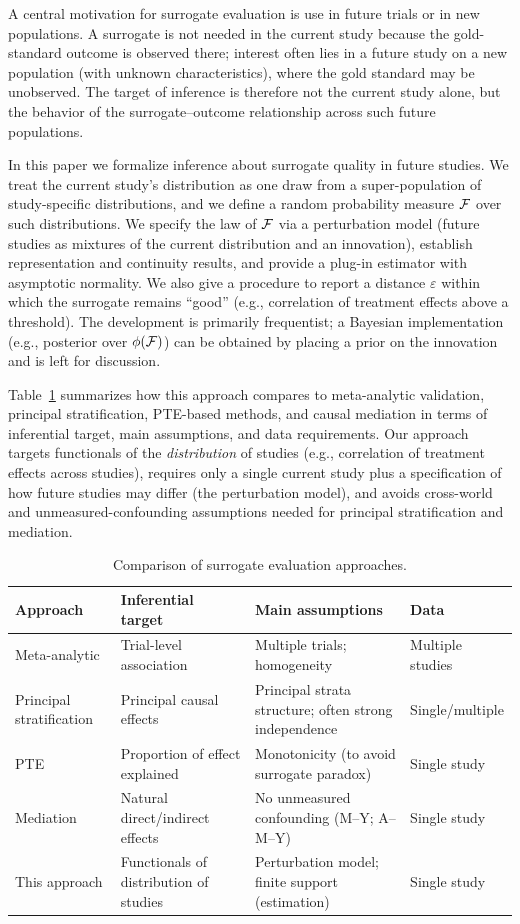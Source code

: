 \documentclass{article}
\begin{document}
A central motivation for surrogate evaluation is use in future trials or in new populations. A surrogate is not needed in the current study because the gold-standard outcome is observed there; interest often lies in a future study on a new population (with unknown characteristics), where the gold standard may be unobserved. The target of inference is therefore not the current study alone, but the behavior of the surrogate--outcome relationship across such future populations.

In this paper we formalize inference about surrogate quality in future studies. We treat the current study's distribution as one draw from a super-population of study-specific distributions, and we define a random probability measure $\mathcal{F}$ over such distributions. We specify the law of $\mathcal{F}$ via a perturbation model (future studies as mixtures of the current distribution and an innovation), establish representation and continuity results, and provide a plug-in estimator with asymptotic normality. We also give a procedure to report a distance $\varepsilon$ within which the surrogate remains ``good'' (e.g., correlation of treatment effects above a threshold). The development is primarily frequentist; a Bayesian implementation (e.g., posterior over $\phi(\mathcal{F})$) can be obtained by placing a prior on the innovation and is left for discussion.

Table~\ref{tab:comparison} summarizes how this approach compares to meta-analytic validation, principal stratification, PTE-based methods, and causal mediation in terms of inferential target, main assumptions, and data requirements. Our approach targets functionals of the \emph{distribution} of studies (e.g., correlation of treatment effects across studies), requires only a single current study plus a specification of how future studies may differ (the perturbation model), and avoids cross-world and unmeasured-confounding assumptions needed for principal stratification and mediation.

\begin{table}[htbp]
\centering
\caption{Comparison of surrogate evaluation approaches.}
\label{tab:comparison}
\begin{tabular}{llll}
\toprule
Approach & Inferential target & Main assumptions & Data \\
\midrule
Meta-analytic \cite{buyse2000validation} & Trial-level association & Multiple trials; homogeneity & Multiple studies \\
Principal stratification \cite{frangakis2002principal} & Principal causal effects & Principal strata structure; often strong independence & Single/multiple \\
PTE \cite{chen2003pte} & Proportion of effect explained & Monotonicity (to avoid surrogate paradox) & Single study \\
Mediation \cite{vanderweele2015mediation} & Natural direct/indirect effects & No unmeasured confounding (M--Y; A--M--Y) & Single study \\
This approach & Functionals of distribution of studies & Perturbation model; finite support (estimation) & Single study \\
\bottomrule
\end{tabular}
\end{table}
\end{document}
